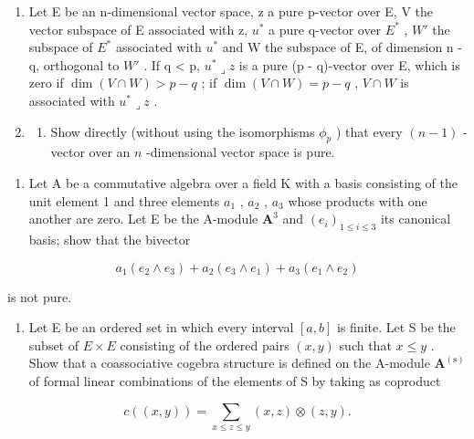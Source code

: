 \begin{enumerate}
\def\labelenumi{\arabic{enumi}.}
\setcounter{enumi}{19}
\item
  Let E be an n-dimensional vector space, z a pure p-vector over E, V the vector subspace of E associated with z, \(u^{*}\) a pure q-vector over \(E^{*}\) , \(W'\) the subspace of \(E^{*}\) associated with \(u^{*}\) and W the subspace of E, of dimension n - q, orthogonal to \(W'\) . If q \textless{} p, \(u^{*} \lrcorner z\) is a pure (p - q)-vector over E, which is zero if \(\dim(V \cap W) > p - q\) ; if \(\dim(V \cap W) = p - q\) , \(V \cap W\) is associated with \(u^{*} \lrcorner z\) .
\item
  \begin{enumerate}
  \def\labelenumii{(\alph{enumii})}
  \tightlist
  \item
    Show directly (without using the isomorphisms \(\phi_p\) ) that every \((n - 1)\) -vector over an \(n\) -dimensional vector space is pure.
  \end{enumerate}
\end{enumerate}

\begin{enumerate}
\def\labelenumi{(\alph{enumi})}
\setcounter{enumi}{1}
\tightlist
\item
  Let A be a commutative algebra over a field K with a basis consisting of the unit element 1 and three elements \(a_{1}\) , \(a_{2}\) , \(a_{3}\) whose products with one another are zero. Let E be the A-module \(\mathbf{A}^3\) and \((e_i)_{1\leqslant i\leqslant 3}\) its canonical basis; show that the bivector
\end{enumerate}

\[
a _ {1} (e _ {2} \land e _ {3}) + a _ {2} (e _ {3} \land e _ {1}) + a _ {3} (e _ {1} \land e _ {2})
\]

is not pure.

\begin{enumerate}
\def\labelenumi{\arabic{enumi}.}
\setcounter{enumi}{21}
\tightlist
\item
  Let E be an ordered set in which every interval \([a, b]\) is finite. Let S be the subset of \(E \times E\) consisting of the ordered pairs \((x, y)\) such that \(x \leqslant y\) . Show that a coassociative cogebra structure is defined on the A-module \(\mathbf{A}^{(\mathrm{s})}\) of formal linear combinations of the elements of S by taking as coproduct
\end{enumerate}

\[
c ((x, y)) = \sum_ {x \leqslant z \leqslant y} (x, z) \otimes (z, y).
\]

